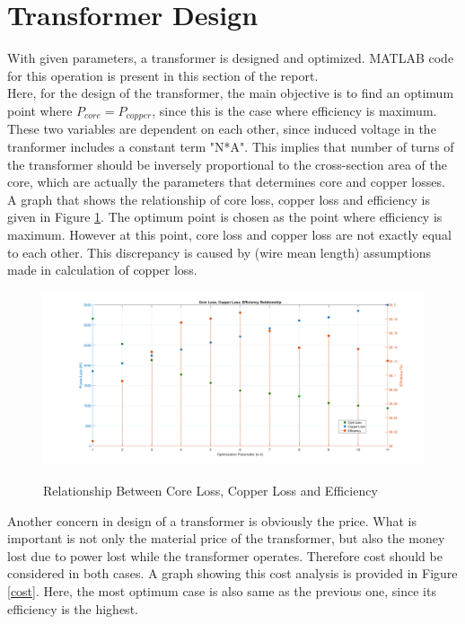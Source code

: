 \section{Transformer Design}

With given parameters, a transformer is designed and optimized. MATLAB code for this operation is present in this section of the report.\\



Here, for the design of the transformer, the main objective is to find an optimum point where $P_{core}=P_{copper}$, since this is the case where efficiency is maximum.\\

These two variables are dependent on each other, since induced voltage in the tranformer includes a constant term "N*A". This implies that number of turns of the transformer should be inversely proportional to the cross-section area of the core, which are actually the parameters that determines core and copper losses.\\

A graph that shows the relationship of core loss, copper loss and efficiency is given in Figure \ref{cce}. The optimum point is chosen as the point where efficiency is maximum. However at this point, core loss and copper loss are not exactly equal to each other. This discrepancy is caused by (wire mean length) assumptions made in calculation of copper loss.

\begin{figure}[H]
\hspace{1.5cm}
\centering\includegraphics[width=5.5in]{core_copper_eff.PNG}\\
\caption{Relationship Between Core Loss, Copper Loss and Efficiency}
\label{cce}
\end{figure}

Another concern in design of a transformer is obviously the price. What is important is not only the material price of the transformer, but also the money lost due to power lost while the transformer operates. Therefore cost should be considered in both cases. A graph showing this cost analysis is provided in Figure \ref{cost}. Here, the most optimum case is also same as the previous one, since its efficiency is the highest.

